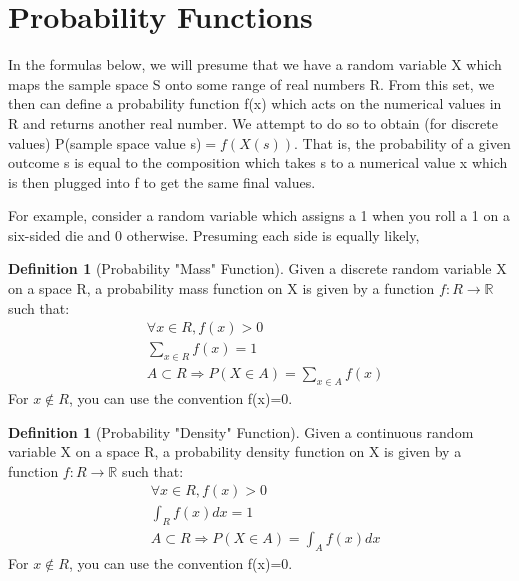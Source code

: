 \documentclass[10pt,]{book}
\theoremstyle{plain}
\theoremstyle{definition}
\newtheorem{definition}[theorem]{Definition}
\theoremstyle{definition}
\theoremstyle{definition}
\numberwithin{equation}{section}
\newcommand{\gt}{ > }
\begin{document}
\section[{Probability Functions}]{Probability Functions}\label{section-27}
In the formulas below, we will presume that we have a random variable X which maps the sample space S onto some range of real numbers R.  From this set, we then can define a probability function f(x) which acts on the numerical values in R and returns another real number.  We attempt to do so to obtain (for discrete values) P(sample space value s)\( = f(X(s))\).  That is, the probability of a given outcome s is equal to the composition which takes s to a numerical value x which is then plugged into f to get the same final values.%
\par
For example, consider a random variable which assigns a 1 when you roll a 1 on a six-sided die and 0 otherwise. Presuming each side is equally likely, 
\begin{definition}[{Probability "Mass" Function}]\label{definition-26}
Given a discrete random variable X on a space R, a probability mass function on X is given by a function \(f:R \rightarrow \mathbb{R}\) such that:
		\begin{align*}
& \forall x \in R , f(x) \gt 0\\
& \sum_{x \in R} f(x) = 1\\
& A \subset R \Rightarrow P(X \in A) = \sum_{x \in A}f(x)
\end{align*}
		For \(x \not\in R\), you can use the convention f(x)=0.
		\end{definition}
\begin{definition}[{Probability "Density" Function}]\label{definition-27}
Given a continuous random variable X on a space R, a probability density function on X is given by a function \(f:R \rightarrow \mathbb{R}\) such that:
			\begin{align*}
& \forall x \in R , f(x) \gt 0\\
& \int_{R} f(x) dx = 1\\
& A \subset R \Rightarrow P(X \in A) = \int_{A} f(x) dx
\end{align*}
		For \(x \not\in R\), you can use the convention f(x)=0.
		\end{definition}
\par
\end{document}
